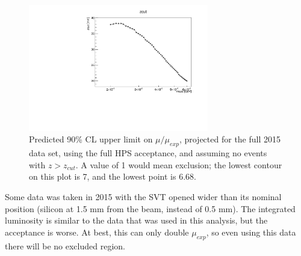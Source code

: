 
\begin{figure}[ht]
\begin{center}
    \includegraphics[width=0.7\textwidth,page=15,angle=-90]{vertexing/figs/golden_fullset_mres_allayers_nosignal_output}
\end{center}
\caption{Predicted 90\% CL upper limit on $\mu/\mu_{exp}$, projected for the full 2015 data set, using the full HPS acceptance, and assuming no events with $z>z_{cut}$. A value of 1 would mean exclusion; the lowest contour on this plot is 7, and the lowest point is 6.68.}
    \label{fig:upper_limit_fullset_alllayers}
\end{figure}

Some data was taken in 2015 with the SVT opened wider than its nominal position (silicon at 1.5 mm from the beam, instead of 0.5 mm).
The integrated luminosity is similar to the data that was used in this analysis, but the acceptance is worse.
At best, this can only double $\mu_{exp}$, so even using this data there will be no excluded region.

